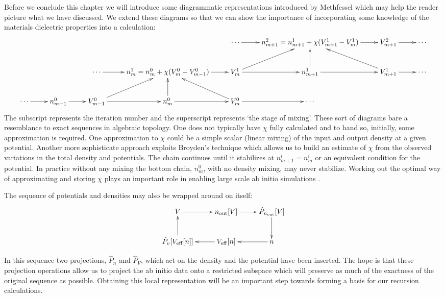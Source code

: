 Before we conclude this chapter we will introduce some diagrammatic representations introduced
by Methfessel which may help the reader picture what we have discussed\cite{methfessel95}.
We extend these diagrams so that we can show the importance of incorporating some knowledge of 
the materials dielectric properties into a calculation:
%
\[\xymatrix{
&             &                   &                 &   \cdots \ar[r]     &       n^{2}_{m+1} = n^{1}_{m+1} + \chi(V^{1}_{m+1} - V^{1}_{m}) \ar[r]  & V^{2}_{m+1} \ar[r] & \cdots \\
&             & \cdots \ar[r] & n^{1}_{m}=n^{0}_{m} + \chi(V^{0}_{m} - V^{0}_{m-1}) \ar[r] & V^{1}_{m} \ar[r] \ar[ur] & n^{1}_{m+1} \ar[u] \ar[r] & V^{1}_{m+1} \ar[ul] \ar[r] & \cdots \\
\cdots \ar[r] & n^{0}_{m-1} \ar[r] & V^{0}_{m-1} \ar[ur] \ar[r] & n^{0}_{m}\ar[u] \ar[r] & V^{0}_{m} \ar[ul] \ar[r] & \cdots &  & \\
}
\]
%
The subscript represents the iteration number and the superscript represents `the stage of mixing'. 
These sort of diagrams bare a resemblance to exact sequences \cite{whitehead50} in algebraic topology.
One does not typically have $\chi$
fully calculated and to hand so, initially, some approximation is required.
One approximation to $\chi$ could be a simple 
scalar (linear mixing) of the input and output density at a given potential. 
Another more sophisticate approach exploits Broyden's technique which allows 
us to build an estimate of $\chi$
from the observed variations in the total density and potentials.
The chain continues until it stabilizes at 
$n^{i}_{m+1}=n^{i}_{m}$ or an equivalent condition for the potential.
In practice without any mixing the bottom chain, $n^{0}_{m}$, with no density mixing, 
may never stabilize. 
Working out the optimal way of approximating and storing $\chi$ plays an important role
in enabling large scale ab initio simulations \cite{vanderbilt84, johnson88}.

The sequence of potentials and densities may also be wrapped around on itself:
%
\[\xymatrix{
	V \ar[r] & n_{\rm out}[V] \ar[r] & \hat{P}_{n_{\rm out}}[V] \ar[d] \\
	\hat{P}_{v}[V_{\rm eff}[n]] \ar[u] & V_{\rm eff}[n] \ar[l] & n\ar[l] \\
}
\]

In this sequence two projections, $\hat{P}_{n}$ and $\hat{P}_{V}$, which 
act on the density and the potential have been inserted. 
The hope is that these projection operations allow us to project the ab initio
data onto a restricted subspace which will preserve as much of the 
exactness of the original sequence as possible. 
Obtaining this local representation will be an important 
step towards forming a basis for our recursion calculations.

